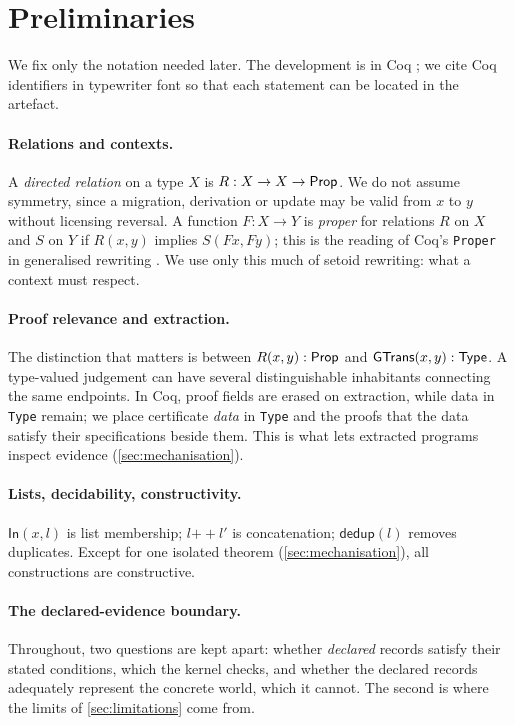 \section{Preliminaries}\label{sec:setting}

We fix only the notation needed later. The development is in Coq \cite{coq818}; we cite Coq identifiers in typewriter font so that each statement can be located in the artefact.

\paragraph{Relations and contexts.}
A \emph{directed relation} on a type $X$ is $R : X \to X \to \mathsf{Prop}$. We do not assume symmetry, since a migration, derivation or update may be valid from $x$ to $y$ without licensing reversal. A function $F : X \to Y$ is \emph{proper} for relations $R$ on $X$ and $S$ on $Y$ if $R(x,y)$ implies $S(Fx,Fy)$; this is the reading of Coq's \texttt{Proper} in generalised rewriting \cite{sozeau2009}. We use only this much of setoid rewriting: what a context must respect.

\paragraph{Proof relevance and extraction.}
The distinction that matters is between $R(x,y) : \mathsf{Prop}$ and $\mathsf{GTrans}(x,y) : \mathsf{Type}$. A type-valued judgement can have several distinguishable inhabitants connecting the same endpoints. In Coq, proof fields are erased on extraction, while data in \texttt{Type} remain; we place certificate \emph{data} in \texttt{Type} and the proofs that the data satisfy their specifications beside them. This is what lets extracted programs inspect evidence (\cref{sec:mechanisation}).

\paragraph{Lists, decidability, constructivity.}
$\mathsf{In}(x,l)$ is list membership; $l \mathbin{+\!\!+} l'$ is concatenation; $\mathsf{dedup}(l)$ removes duplicates. Except for one isolated theorem (\cref{sec:mechanisation}), all constructions are constructive.

\paragraph{The declared-evidence boundary.}
Throughout, two questions are kept apart: whether \emph{declared} records satisfy their stated conditions, which the kernel checks, and whether the declared records adequately represent the concrete world, which it cannot. The second is where the limits of \cref{sec:limitations} come from.

